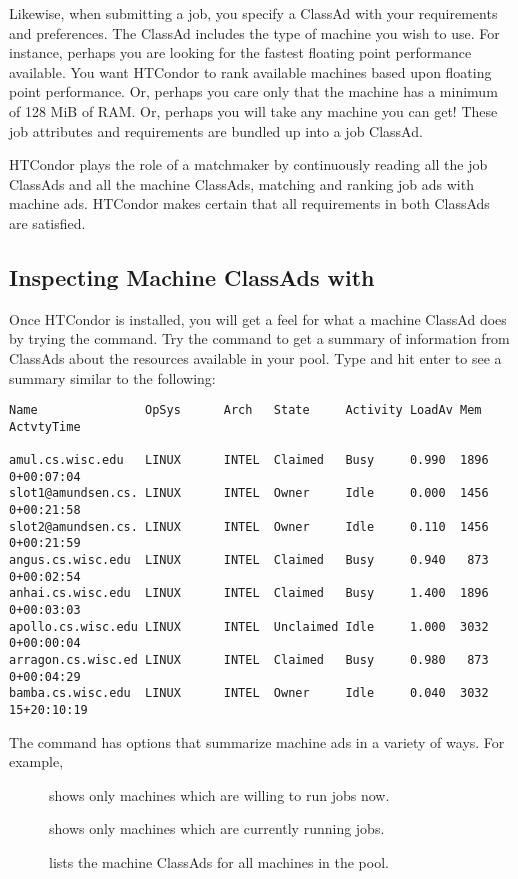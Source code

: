 Likewise, when submitting a job, you specify a ClassAd with
your requirements and preferences.
The ClassAd
includes the
type of machine you  wish to use. For instance, perhaps you are
looking for the fastest floating point performance available.
You want HTCondor to rank available machines
based upon floating point performance. Or, perhaps you
care only that the machine has a minimum of 128 MiB of RAM.
Or, perhaps you will
take any machine you can get! These job attributes and requirements
are bundled up into a job ClassAd.

HTCondor plays the role of a matchmaker by continuously reading
all the job ClassAds and all the machine ClassAds, 
matching and ranking job ads with machine ads.
HTCondor makes certain that all
requirements in both ClassAds are satisfied. 

\subsection{Inspecting Machine ClassAds with }

Once HTCondor is installed,
you will get a feel for what
a machine ClassAd does by trying
the  command.
Try the  command to get
a summary of information from
ClassAds about the resources available in your pool.
Type  and hit enter to see a summary 
similar to the following:
\footnotesize
\begin{verbatim}
Name               OpSys      Arch   State     Activity LoadAv Mem   ActvtyTime

amul.cs.wisc.edu   LINUX      INTEL  Claimed   Busy     0.990  1896  0+00:07:04
slot1@amundsen.cs. LINUX      INTEL  Owner     Idle     0.000  1456  0+00:21:58
slot2@amundsen.cs. LINUX      INTEL  Owner     Idle     0.110  1456  0+00:21:59
angus.cs.wisc.edu  LINUX      INTEL  Claimed   Busy     0.940   873  0+00:02:54
anhai.cs.wisc.edu  LINUX      INTEL  Claimed   Busy     1.400  1896  0+00:03:03
apollo.cs.wisc.edu LINUX      INTEL  Unclaimed Idle     1.000  3032  0+00:00:04
arragon.cs.wisc.ed LINUX      INTEL  Claimed   Busy     0.980   873  0+00:04:29
bamba.cs.wisc.edu  LINUX      INTEL  Owner     Idle     0.040  3032 15+20:10:19
\end{verbatim}
\normalsize
\Dots 


The  command has options that summarize machine ads 
in a variety of ways.
For example,
\begin{description}
\item[] shows only machines which are
willing to run jobs now. 
\item[] shows only machines
which are currently running jobs.  
\item[] lists the machine ClassAds for all machines
in the pool.
\end{description}

